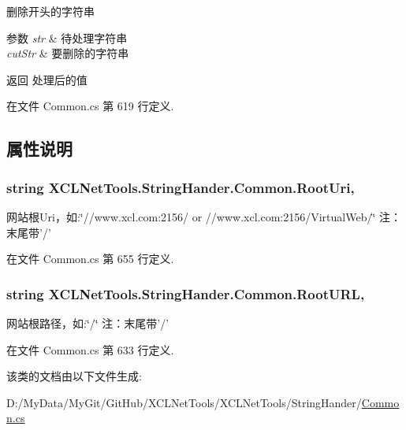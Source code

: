 删除开头的字符串 


\begin{DoxyParams}{参数}
{\em str} & 待处理字符串\\
\hline
{\em cut\-Str} & 要删除的字符串\\
\hline
\end{DoxyParams}
\begin{DoxyReturn}{返回}
处理后的值
\end{DoxyReturn}


在文件 Common.\-cs 第 619 行定义.



\subsection{属性说明}
\hypertarget{class_x_c_l_net_tools_1_1_string_hander_1_1_common_ae924e6a3e073efd4a75d53ea7095f976}{
\subsubsection[{Root\-Uri}]{\setlength{\rightskip}{0pt plus 5cm}string X\-C\-L\-Net\-Tools.\-String\-Hander.\-Common.\-Root\-Uri\hspace{0.3cm}{\ttfamily [static]}, {\ttfamily [get]}}}\label{class_x_c_l_net_tools_1_1_string_hander_1_1_common_ae924e6a3e073efd4a75d53ea7095f976}


网站根\-Uri，如\-:\char`\"{}//www.\-xcl.\-com\-:2156/ or //www.\-xcl.\-com\-:2156/\-Virtual\-Web/\char`\"{} 注：末尾带'/' 



在文件 Common.\-cs 第 655 行定义.

\hypertarget{class_x_c_l_net_tools_1_1_string_hander_1_1_common_a87e9775b7bdaaf9bc205a148b1335ee2}{
\subsubsection[{Root\-U\-R\-L}]{\setlength{\rightskip}{0pt plus 5cm}string X\-C\-L\-Net\-Tools.\-String\-Hander.\-Common.\-Root\-U\-R\-L\hspace{0.3cm}{\ttfamily [static]}, {\ttfamily [get]}}}\label{class_x_c_l_net_tools_1_1_string_hander_1_1_common_a87e9775b7bdaaf9bc205a148b1335ee2}


网站根路径，如\-:\char`\"{}/\char`\"{} 注：末尾带'/' 



在文件 Common.\-cs 第 633 行定义.



该类的文档由以下文件生成\-:\begin{DoxyCompactItemize}
\item 
D\-:/\-My\-Data/\-My\-Git/\-Git\-Hub/\-X\-C\-L\-Net\-Tools/\-X\-C\-L\-Net\-Tools/\-String\-Hander/\hyperlink{_common_8cs}{Common.\-cs}\end{DoxyCompactItemize}
